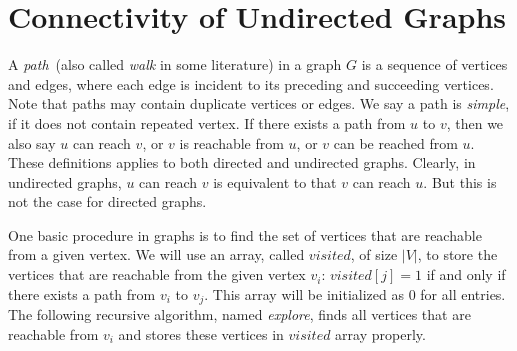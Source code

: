 \setcounter{definition}{0} \setcounter{property}{0} \setcounter{claim}{0} \setcounter{fact}{0} \setcounter{corollary}{0} \setcounter{figure}{0}
\section{Connectivity of Undirected Graphs}

A \emph{path}~(also called \emph{walk} in some literature)
in a graph $G$ is a sequence of vertices and edges,
where each edge is incident to its preceding and succeeding vertices.
Note that paths may contain duplicate vertices or edges.
We say a path is \emph{simple}, if it does not contain repeated vertex.
If there exists a path from $u$ to $v$,
then we also say $u$ can reach $v$, or $v$ is reachable from $u$, or $v$ can be reached from $u$.
These definitions applies to both directed and undirected graphs.
Clearly, in undirected graphs, $u$ can reach $v$ is equivalent to that $v$ can reach $u$.
But this is not the case for directed graphs.

%


One basic procedure in graphs is to find the set of vertices that are reachable from a given vertex.
We will use an array, called $visited$, of size $|V|$, to store the vertices that are reachable from
the given vertex $v_i$: $visited[j] = 1$ if and only if there exists a path from $v_i$ to $v_j$.
This array will be initialized as 0 for all entries.
The following recursive algorithm, named \emph{explore}, finds all vertices that are reachable from $v_i$
and stores these vertices in $visited$ array properly.


